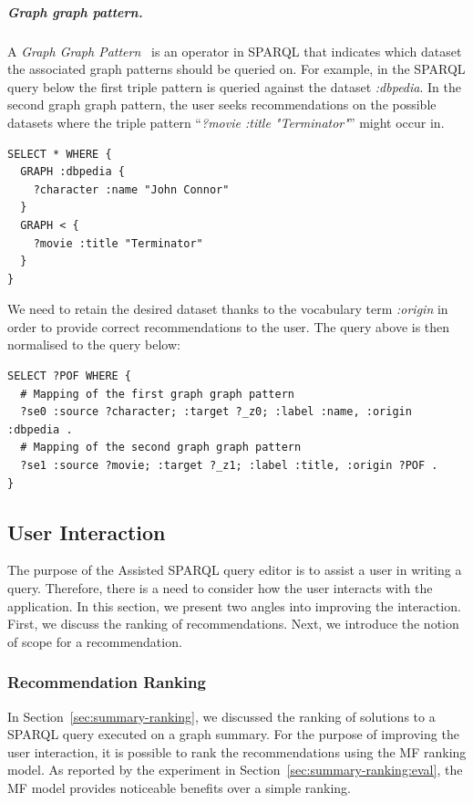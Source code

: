 \subparagraph{Graph graph pattern.}

A \emph{Graph Graph Pattern}~\cite{PrudS08} is an operator in SPARQL that indicates which dataset the associated graph patterns should be queried on. For example, in the SPARQL query below the first triple pattern is queried against the dataset \emph{:dbpedia}. In the second graph graph pattern, the user seeks recommendations on the possible datasets where the triple pattern ``\emph{?movie :title "Terminator"}'' might occur in.

\begin{verbatim}
SELECT * WHERE {
  GRAPH :dbpedia {
    ?character :name "John Connor"
  }
  GRAPH < {
    ?movie :title "Terminator"
  }
}
\end{verbatim}

We need to retain the desired dataset thanks to the vocabulary term \emph{:origin} in order to provide correct recommendations to the user. The query above is then normalised to the query below:

\begin{verbatim}
SELECT ?POF WHERE {
  # Mapping of the first graph graph pattern
  ?se0 :source ?character; :target ?_z0; :label :name, :origin :dbpedia .
  # Mapping of the second graph graph pattern
  ?se1 :source ?movie; :target ?_z1; :label :title, :origin ?POF .
}
\end{verbatim}

\subsection{User Interaction}

The purpose of the Assisted SPARQL query editor is to assist a user in writing a query. Therefore, there is a need to consider how the user interacts with the application.
In this section, we present two angles into improving the interaction. First, we discuss the ranking of recommendations. Next, we introduce the notion of scope for a recommendation.

\subsubsection{Recommendation Ranking}

In Section~\ref{sec:summary-ranking}, we discussed the ranking of solutions to a SPARQL query executed on a graph summary. For the purpose of improving the user interaction, it is possible to rank the recommendations using the \gls{MF} ranking model. As reported by the experiment in Section~\ref{sec:summary-ranking:eval}, the \gls{MF} model provides noticeable benefits over a simple ranking.


